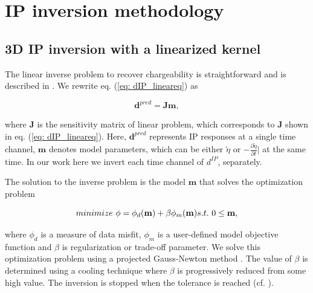 \documentclass[extra,mreferee]{gji}
\newcommand{\peta}{\tilde{\eta}}
\begin{document}
\section{IP inversion methodology}

\subsection{3D IP inversion with a linearized kernel}
The linear inverse problem to recover chargeability is straightforward and is described in \cite{doug1994}. 
We rewrite eq. (\ref{eq: dIP_lineareq}) as
\begin{linenomath*}
\begin{equation}
  \mathbf{d}^{pred} = \mathbf{J}\mathbf{m},
  \label{eq9}
\end{equation}
\end{linenomath*}
where $\mathbf{J}$ is the  sensitivity matrix of linear problem, which corresponds to $\mathbf{J}$ shown in eq. (\ref{eq: dIP_lineareq}). 
Here, $\mathbf{d}^{pred}$ represents IP responses at a single time channel, $\mathbf{m}$ denotes model parameters, which can be either $\peta$ or $-\frac{\partial \peta}{\partial t}\big|$ at the same time. 
In our work here we invert each time channel of $d^{IP}$, separately. 

The solution to the inverse problem is the model $\mathbf{m}$ that solves the optimization problem
\begin{linenomath*}
\begin{equation}
  minimize \ \phi =  \phi_d(\mathbf{m}) + \beta\phi_m(\mathbf{m}) \\
  s.t. \ 0 \le \mathbf{m},
  \label{eq10}
\end{equation}
\end{linenomath*}
where $\phi_d$ is a measure of data misfit, $\phi_m$ is a user-defined model objective function and $\beta$ is regularization or trade-off parameter. We solve this optimization problem using a projected Gauss-Newton method \cite[]{Kelley}. 
The value of $\beta$ is determined using a cooling technique where $\beta$ is progressively reduced from some high value. The inversion is stopped when the tolerance is reached (cf. \cite{DougTutorial, Kang2014}). 
\end{document}
